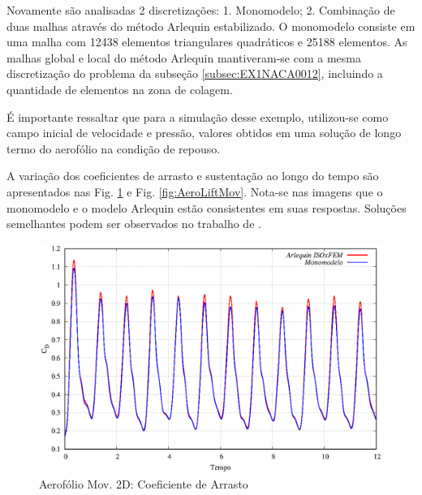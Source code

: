 \documentclass[tese_patricia]{subfiles}
\begin{document}
Novamente são analisadas 2 discretizações: 1. Monomodelo; 2. Combinação de duas malhas através do método Arlequin estabilizado.
O monomodelo consiste em uma malha com 12438 elementos triangulares quadráticos e 25188 elementos. As malhas global e local do método Arlequin mantiveram-se com a mesma discretização do problema da subseção \ref{subsec:EX1NACA0012}, incluindo a quantidade de elementos na zona de colagem.

É importante ressaltar que para a simulação desse exemplo, utilizou-se como campo inicial de velocidade e pressão, valores obtidos em uma solução de longo termo do aerofólio na condição de repouso.

A variação dos coeficientes de arrasto e sustentação ao longo do tempo são apresentados nas Fig. \ref{fig:AeroDragMov} e Fig. \ref{fig:AeroLiftMov}. Nota-se nas imagens que o monomodelo e o modelo Arlequin estão consistentes em suas respostas. Soluções semelhantes podem ser observados no trabalho de .

\begin{figure}[htb!]
	\centering 
	\includegraphics[scale=1.0,trim=0cm 0cm 0cm 0cm, clip=true]{Imagens/Cap6/DragMov.eps}	
	\caption{Aerofólio Mov. 2D: Coeficiente de Arrasto}
	\label{fig:AeroDragMov}
\end{figure}
\end{document}
